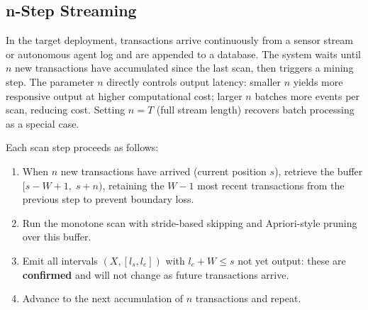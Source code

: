 \subsection{n-Step Streaming}

In the target deployment, transactions arrive continuously from a
sensor stream or autonomous agent log and are appended to a database.
The system waits until $n$ new transactions have accumulated since the
last scan, then triggers a mining step.
The parameter $n$ directly controls output latency: smaller $n$ yields
more responsive output at higher computational cost; larger $n$ batches
more events per scan, reducing cost.
Setting $n = T$ (full stream length) recovers batch processing as a
special case.

Each scan step proceeds as follows:

\begin{enumerate}
  \item When $n$ new transactions have arrived (current position $s$),
        retrieve the buffer $[s - W + 1,\; s + n)$, retaining the
        $W{-}1$ most recent transactions from the previous step to
        prevent boundary loss.
  \item Run the monotone scan with stride-based skipping and
        Apriori-style pruning over this buffer.
  \item Emit all intervals $(X, [l_s, l_e])$ with $l_e + W \leq s$
        not yet output: these are \textbf{confirmed} and will not
        change as future transactions arrive.
  \item Advance to the next accumulation of $n$ transactions and repeat.
\end{enumerate}
